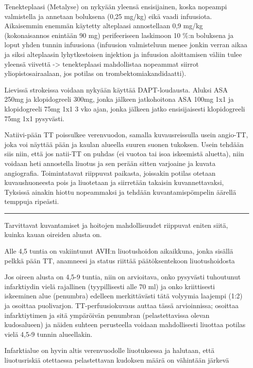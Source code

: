 \documentclass[
]{book}
\begin{document}
Tenekteplaasi (Metalyse) on nykyään yleensä ensisijainen, koska nopeampi valmistella ja annetaan boluksena (0,25 mg/kg) eikä vaadi infuusiota. Aikaisemmin enemmän käytetty alteplaasi annostellaan 0,9 mg/kg (kokonaisannos enintään 90 mg) perifeeriseen laskimoon 10 \%:n boluksena ja loput yhden tunnin infuusiona (infuusion valmisteluun menee jonkin verran aikaa ja siksi alteplaasin lyhytkestoisen injektion ja infuusion aloittamisen väliin tulee yleensä viivettä -\textgreater{} tenekteplaasi mahdollistaa nopeammat siirrot yliopistosairaalaan, jos potilas on trombektomiakandidaatti).

Lievissä strokeissa voidaan nykyään käyttää DAPT-loudausta. Aluksi ASA 250mg ja klopidogreeli 300mg, jonka jälkeen jatkohoitona ASA 100mg 1x1 ja klopidogreeli 75mg 1x1 3 vko ajan, jonka jälkeen jatko ensisijaisesti klopidogreeli 75mg 1x1 pysyvästi.

Natiivi-pään TT poissulkee verenvuodon, samalla kuvausreissulla usein angio-TT, joka voi näyttää pään ja kaulan alueella suuren suonen tukoksen. Usein tehdään siis niin, että jos natii-TT on puhdas (ei vuotoa tai isoa iskeemistä aluetta), niin voidaan heti annostella liuotus ja sen perään sitten varjoaine ja kuvata angiografia. Toimintatavat riippuvat paikasta, joissakin potilas otetaan kuvaushuoneesta pois ja liuotetaan ja siirretään takaisin kuvannettavaksi, Tyksissä ainakin hiottu nopeammaksi ja tehdään kuvantamispömpelin äärellä temppuja ripeästi.

\begin{center}\rule{0.5\linewidth}{0.5pt}\end{center}

Tarvittavat kuvantamiset ja hoitojen mahdollisuudet riippuvat eniten siitä, kuinka kauan oireiden alusta on.

Alle 4,5 tuntia on vakiintunut AVH:n liuotushoidon aikaikkuna, jonka sisällä pelkkä pään TT, anamneesi ja status riittää päätöksentekoon liuotushoidosta

Jos oireen alusta on 4,5-9 tuntia, niin on arvioitava, onko pysyvästi tuhoutunut infarktiydin vielä rajallinen (tyypillisesti alle 70 ml) ja onko kriittisesti iskeeminen alue (penumbra) edelleen merkittävästi tätä volyymia laajempi (1:2) ja osoittaa puolivarjon. TT-perfuusiokuvaus auttaa tässä arvioinnissa; osoittaa infarktiytimen ja sitä ympäröivän penumbran (pelastettavissa olevan kudosalueen) ja näiden suhteen perusteella voidaan mahdollisesti liuottaa potilas vielä 4,5-9 tunnin alueellakin.

Infarktialue on hyvin altis verenvuodolle liuotuksessa ja halutaan, että liuotusriskiä otettaessa pelastettavan kudoksen määrä on vähintään järkevä
\end{document}

